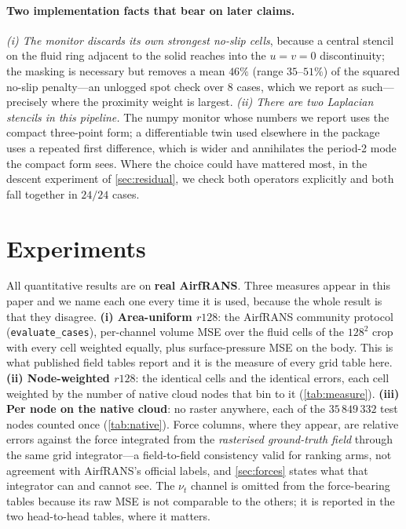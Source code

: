 \paragraph{Two implementation facts that bear on later claims.} \emph{(i) The monitor
discards its own strongest no-slip cells}, because a central stencil on the fluid ring
adjacent to the solid reaches into the $u=v=0$ discontinuity; the masking is necessary but
removes a mean $46\%$ (range $35$--$51\%$) of the squared no-slip penalty---an unlogged
spot check over $8$ cases, which we report as such---precisely where the proximity weight
is largest. \emph{(ii) There are two Laplacian stencils in this pipeline.} The numpy
monitor whose numbers we report uses the compact three-point form; a differentiable twin
used elsewhere in the package uses a repeated first difference, which is wider and
annihilates the period-2 mode the compact form sees. Where the choice could have mattered
most, in the descent experiment of \autoref{sec:residual}, we check both operators
explicitly and both fall together in $24/24$ cases.

\section{Experiments}
\label{sec:experiments}

All quantitative results are on \textbf{real AirfRANS}. Three measures appear in this
paper and we name each one every time it is used, because the whole result is that they
disagree. \textbf{(i) Area-uniform $r128$}: the AirfRANS community protocol
(\texttt{evaluate\_cases}), per-channel volume MSE over the fluid cells of the
$128^2$ crop with every cell weighted equally, plus surface-pressure MSE on the body. This
is what published field tables report and it is the measure of every grid table here.
\textbf{(ii) Node-weighted $r128$}: the identical cells and the identical errors, each cell
weighted by the number of native cloud nodes that bin to it (\autoref{tab:measure}).
\textbf{(iii) Per node on the native cloud}: no raster anywhere, each of the
$35\,849\,332$ test nodes counted once (\autoref{tab:native}). Force columns, where they
appear, are relative errors against the force integrated from the \emph{rasterised
ground-truth field} through the same grid integrator---a field-to-field consistency valid
for ranking arms, not agreement with AirfRANS's official labels, and
\autoref{sec:forces} states what that integrator can and cannot see. The $\nu_t$ channel is
omitted from the force-bearing tables because its raw MSE is not comparable to the others;
it is reported in the two head-to-head tables, where it matters.

